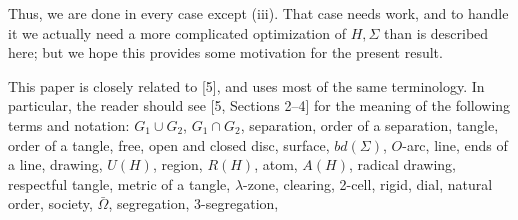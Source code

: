 Thus, we are done in every case except (iii). That case needs work, and to handle it we actually need a more complicated optimization of $H, \Sigma$ than is described here; but we hope this provides some motivation for the present result.

This paper is closely related to [5], and uses most of the same terminology. In particular, the reader should see [5, Sections 2--4] for the meaning of the following terms and notation: $G_1 \cup G_2$, $G_1 \cap G_2$, separation, order of a separation, tangle, order of a tangle, free, open and closed disc, surface, $bd(\Sigma)$, $O$-arc, line, ends of a line, drawing, $U(H)$, region, $R(H)$, atom, $A(H)$, radical drawing, respectful tangle, metric of a tangle, $\lambda$-zone, clearing, 2-cell, rigid, dial, natural order, society, $\bar{\Omega}$, segregation, 3-segregation,
